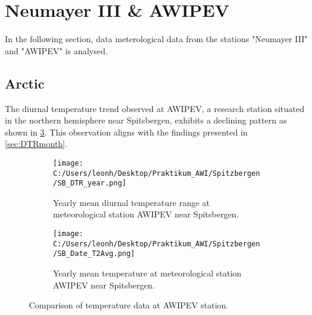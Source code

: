 \clearpage

\section{Neumayer III \& AWIPEV}

In the following section, data meterological data from the stations "Neumayer III" and "AWIPEV" is analysed.

\subsection*{Arctic}

The diurnal temperature trend observed at AWIPEV, a research station situated in the northern hemisphere near Spitsbergen, exhibits a declining pattern as shown in \cref{fig:AWIPEVcomparison}. This observation aligns with the findings presented in \cref*{sec:DTRmonth}.
\begin{figure}[ht]
    \centering

    \begin{subfigure}[t]{0.48\textwidth}
        \texttt{[image: C:/Users/leonh/Desktop/Praktikum\_AWI/Spitzbergen/SB\_DTR\_year.png]}
        \caption{Yearly mean diurnal temperature range at meteorological station AWIPEV near Spitsbergen.}
        \label{fig:DTRyearAWIPEV}
    \end{subfigure}
    \hfill
    \begin{subfigure}[t]{0.48\textwidth}
        \texttt{[image: C:/Users/leonh/Desktop/Praktikum\_AWI/Spitzbergen/SB\_Date\_T2Avg.png]}
        \caption{Yearly mean temperature at meteorological station AWIPEV near Spitsbergen.}
        \label{fig:TAvgyearAWIPEV}
    \end{subfigure}
    \caption{Comparison of temperature data at AWIPEV station.}
    \label{fig:AWIPEVcomparison}
\end{figure}

